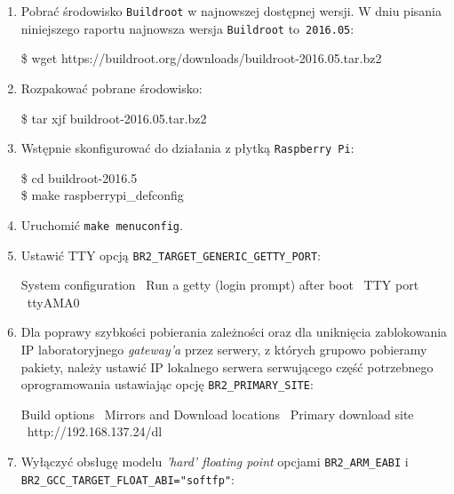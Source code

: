 \documentclass{article}
\newcommand{\buildrootver}{2016.05}
\newenvironment{ttblock}{\ttfamily}{\par}
\begin{document}
\begin{enumerate}
\item Pobrać środowisko \texttt{Buildroot} w najnowszej dostępnej wersji. W dniu pisania niniejszego raportu najnowsza wersja \texttt{Buildroot} to~\texttt{\buildrootver}:

\begin{ttblock}
\$ wget https://buildroot.org/downloads/buildroot-\buildrootver.tar.bz2
\end{ttblock}

\item Rozpakować pobrane środowisko:

\begin{ttblock}
\$ tar xjf buildroot-\buildrootver.tar.bz2
\end{ttblock}

\item Wstępnie skonfigurować do działania z płytką \texttt{Raspberry~Pi}:

\begin{ttblock}
\$ cd buildroot-2016.5\\
\$ make raspberrypi\_defconfig
\end{ttblock}

\item Uruchomić \texttt{make menuconfig}.

\item Ustawić TTY opcją \texttt{BR2\_TARGET\_GENERIC\_GETTY\_PORT}:

\begin{ttblock}
System configuration \textrightarrow\ Run a getty (login prompt) after boot \textrightarrow\ TTY port \textrightarrow\ ttyAMA0
\end{ttblock}

\item Dla poprawy szybkości pobierania zależności oraz dla uniknięcia zablokowania IP laboratoryjnego \emph{gateway'a} przez serwery, z których grupowo pobieramy pakiety, należy ustawić IP lokalnego serwera serwującego część potrzebnego oprogramowania ustawiając opcję \texttt{BR2\_PRIMARY\_SITE}:

\begin{ttblock}
Build options \textrightarrow\ Mirrors and Download locations \textrightarrow\ Primary download site \textrightarrow\ http://192.168.137.24/dl
\end{ttblock}

\sloppy
\item Wyłączyć obsługę modelu \emph{'hard' floating point} opcjami \texttt{BR2\_ARM\_EABI} i \texttt{BR2\_GCC\_TARGET\_FLOAT\_ABI="softfp"}:


\end{enumerate}
\end{document}
